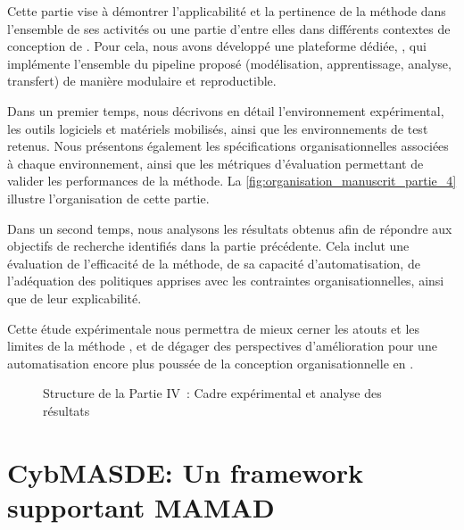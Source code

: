 \noindent
Cette partie vise à démontrer l'applicabilité et la pertinence de la méthode  dans l'ensemble de ses activités ou une partie d'entre elles dans différents contextes de conception de . Pour cela, nous avons développé une plateforme dédiée, , qui implémente l'ensemble du pipeline proposé (modélisation, apprentissage, analyse, transfert) de manière modulaire et reproductible.

\medskip

\noindent
Dans un premier temps, nous décrivons en détail l'environnement expérimental, les outils logiciels et matériels mobilisés, ainsi que les environnements de test retenus. Nous présentons également les spécifications organisationnelles associées à chaque environnement, ainsi que les métriques d'évaluation permettant de valider les performances de la méthode. La \autoref{fig:organisation_manuscrit_partie_4} illustre l'organisation de cette partie.

\medskip

\noindent
Dans un second temps, nous analysons les résultats obtenus afin de répondre aux objectifs de recherche identifiés dans la partie précédente. Cela inclut une évaluation de l'efficacité de la méthode, de sa capacité d'automatisation, de l'adéquation des politiques apprises avec les contraintes organisationnelles, ainsi que de leur explicabilité.

\medskip

\noindent
Cette étude expérimentale nous permettra de mieux cerner les atouts et les limites de la méthode , et de dégager des perspectives d'amélioration pour une automatisation encore plus poussée de la conception organisationnelle en .

\begin{figure}[h!]
  \centering
  \resizebox{0.7\linewidth}{!}{%
    
  }
  \caption{Structure de la Partie IV~: Cadre expérimental et analyse des résultats}
  \label{fig:organisation_manuscrit_partie_4}
\end{figure}

\clearpage
\thispagestyle{empty}
\null
\newpage

\chapter{CybMASDE: Un framework supportant MAMAD}
\label{sec:cybmasde}


